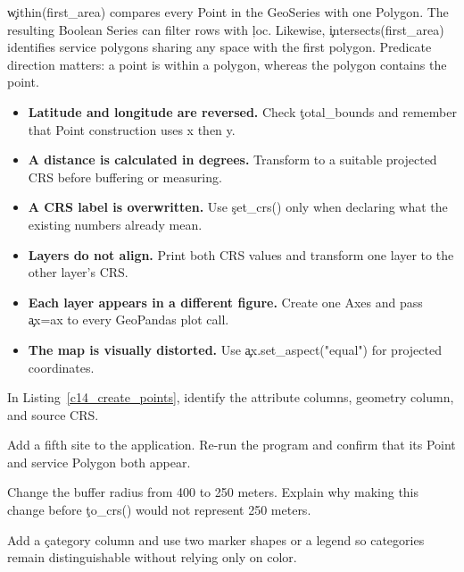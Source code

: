 \c{within(first_area)} compares every Point in the GeoSeries with one Polygon.
The resulting Boolean Series can filter rows with \c{loc}. Likewise,
\c{intersects(first_area)} identifies service polygons sharing any space with
the first polygon. Predicate direction matters: a point is within a polygon,
whereas the polygon contains the point.


\begin{itemize}
    \item \textbf{Latitude and longitude are reversed.} Check \c{total_bounds}
          and remember that Point construction uses x then y.
    \item \textbf{A distance is calculated in degrees.} Transform to a suitable
          projected CRS before buffering or measuring.
    \item \textbf{A CRS label is overwritten.} Use \c{set_crs()} only when
          declaring what the existing numbers already mean.
    \item \textbf{Layers do not align.} Print both CRS values and transform one
          layer to the other layer's CRS.
    \item \textbf{Each layer appears in a different figure.} Create one Axes and
          pass \c{ax=ax} to every GeoPandas plot call.
    \item \textbf{The map is visually distorted.} Use \c{ax.set_aspect("equal")}
          for projected coordinates.
\end{itemize}



In Listing~\ref{c14_create_points}, identify the attribute columns, geometry
column, and source CRS.


Add a fifth site to the application. Re-run the program and confirm that its
Point and service Polygon both appear.


Change the buffer radius from 400 to 250 meters. Explain why making this change
before \c{to_crs()} would not represent 250 meters.


Add a \c{category} column and use two marker shapes or a legend so categories
remain distinguishable without relying only on color.

